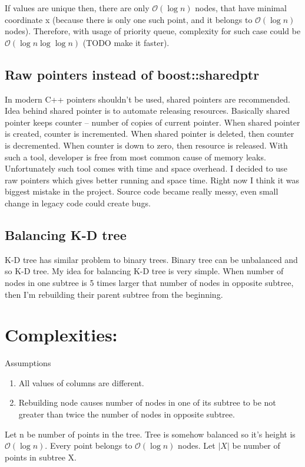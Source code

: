 \documentclass[10pt,a4paper]{article}
\newcommand{\Oh}{\mathcal{O}}
\begin{document}
If values are unique then, there are only $\Oh(\log n)$ nodes, that have minimal coordinate x (because there is only one such point, and it belongs to $\Oh(\log n)$ nodes). Therefore, with usage of priority queue, complexity for such case could be $\Oh(\log n \log \log n)$ (TODO make it faster).

\subsection{Raw pointers instead of boost::shared\textunderscore ptr}

In modern C++ pointers shouldn't be used, shared pointers are recommended. Idea behind shared pointer is to automate releasing resources. Basically shared pointer keeps counter – number of copies of current pointer. When shared pointer is created, counter is incremented. When shared pointer is deleted, then counter is decremented. When counter is down to zero, then resource is released. With such a tool, developer is free from most common cause of memory leaks. Unfortunately such tool comes with time and space overhead. I decided to use raw pointers which gives better running and space time.
Right now I think it was biggest mistake in the project. Source code became really messy, even small change in legacy code could create bugs.

\subsection{Balancing K-D tree}
K-D tree has similar problem to binary trees. Binary tree can be unbalanced and so K-D tree. My idea for balancing K-D tree is very simple. When number of nodes in one subtree is 5 times larger that number of nodes in opposite subtree, then I'm rebuilding their parent subtree from the beginning.

\section{Complexities:}

Assumptions
\begin{enumerate}
\item All values of columns are different.
\item Rebuilding node causes number of nodes in one of its subtree to be not greater than twice the number of nodes in opposite subtree.
\end{enumerate}

Let n be number of points in the tree. Tree is somehow balanced so it's height is $\Oh(\log n)$. Every point belongs to $\Oh(\log n)$ nodes. Let $|X|$ be number of points in subtree X.
\end{document}
